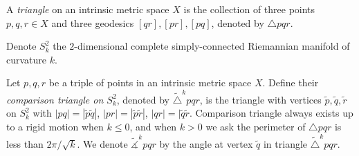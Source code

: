 \begin{defn}
    A \emph{triangle} on an intrinsic metric space $X$ is the collection of three points $p,q,r\in X$ and three geodesics $[qr],[pr],[pq]$, denoted by $\triangle pqr$.
\end{defn}

\begin{nota}
    Denote $S^2_k$ the $2$-dimensional complete simply-connected Riemannian manifold of curvature $k$.
\end{nota}

\begin{defn}
    Let $p,q,r$ be a triple of points in an intrinsic metric space $X$.
    Define their \emph{comparison triangle on $S^2_k$}, denoted by $\tilde{\triangle}^kpqr$, is the triangle with vertices $\tilde{p},\tilde{q},\tilde{r}$ on $S^2_k$ with $|pq|=|\tilde{p}\tilde{q}|$, $|pr|=|\tilde{p}\tilde{r}|$, $|qr|=|\tilde{q}\tilde{r}$.
    Comparison triangle always exists up to a rigid motion when $k\leq 0$, and when $k>0$ we ask the perimeter of $\triangle{pqr}$ is less than $2\pi/\sqrt{k}$.
    We denote $\tilde{\measuredangle}^kpqr$ by the angle at vertex $\tilde{q}$ in triangle $\tilde{\triangle}^kpqr$.
\end{defn}
